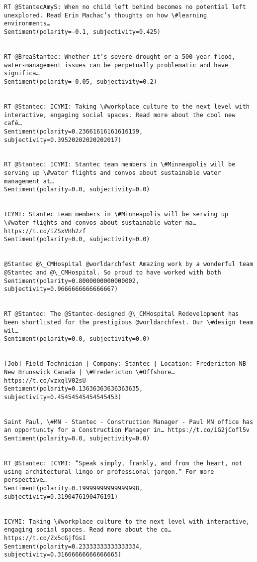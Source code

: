 \documentclass[11pt]{article}
\begin{document}
\begin{Verbatim}[commandchars=\\\{\}]
RT @StantecAmyS: When no child left behind becomes no potential left unexplored. Read Erin Machac’s thoughts on how \#learning environments…
Sentiment(polarity=-0.1, subjectivity=0.425)


RT @BreaStantec: Whether it’s severe drought or a 500-year flood, water-management issues can be perpetually problematic and have significa…
Sentiment(polarity=-0.05, subjectivity=0.2)


RT @Stantec: ICYMI: Taking \#workplace culture to the next level with interactive, engaging social spaces. Read more about the cool new café…
Sentiment(polarity=0.23661616161616159, subjectivity=0.39520202020202017)


RT @Stantec: ICYMI: Stantec team members in \#Minneapolis will be serving up \#water flights and convos about sustainable water management at…
Sentiment(polarity=0.0, subjectivity=0.0)


ICYMI: Stantec team members in \#Minneapolis will be serving up \#water flights and convos about sustainable water ma… https://t.co/iZSxVHh2zf
Sentiment(polarity=0.0, subjectivity=0.0)


@Stantec @\_CMHospital @worldarchfest Amazing work by a wonderful team @Stantec and @\_CMHospital. So proud to have worked with both
Sentiment(polarity=0.8000000000000002, subjectivity=0.9666666666666667)


RT @Stantec: The @Stantec-designed @\_CMHospital Redevelopment has been shortlisted for the prestigious @worldarchfest. Our \#design team wil…
Sentiment(polarity=0.0, subjectivity=0.0)


[Job] Field Technician | Company: Stantec | Location: Fredericton NB New Brunswick Canada | \#Fredericton \#Offshore… https://t.co/vzxqlV02sU
Sentiment(polarity=0.13636363636363635, subjectivity=0.45454545454545453)


Saint Paul, \#MN - Stantec - Construction Manager - Paul MN office has an opportunity for a Construction Manager in… https://t.co/iG2jCofl5v
Sentiment(polarity=0.0, subjectivity=0.0)


RT @Stantec: ICYMI: “Speak simply, frankly, and from the heart, not using architectural lingo or professional jargon.” For more perspective…
Sentiment(polarity=0.19999999999999998, subjectivity=0.3190476190476191)


ICYMI: Taking \#workplace culture to the next level with interactive, engaging social spaces. Read more about the co… https://t.co/Zx5cGjfGsI
Sentiment(polarity=0.23333333333333334, subjectivity=0.31666666666666665)



\end{Verbatim}
\end{document}

